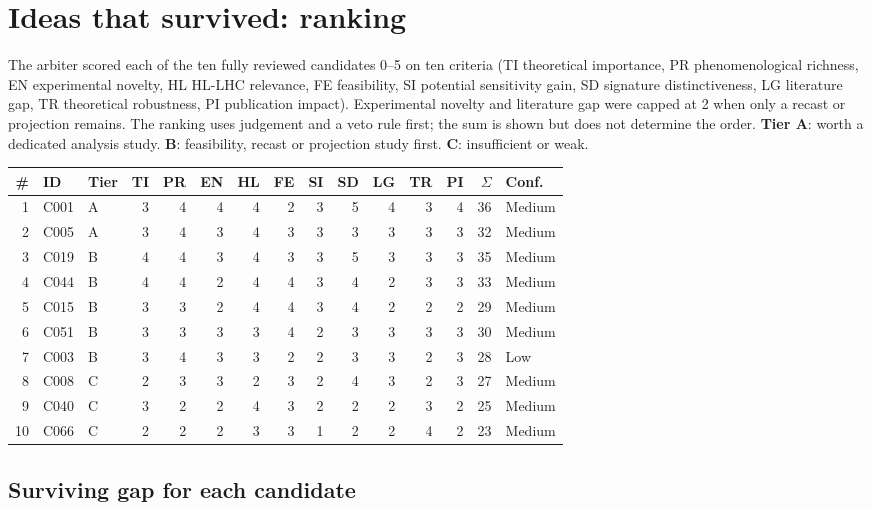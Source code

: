 \documentclass[11pt,a4paper]{article}
\begin{document}
\section{Ideas that survived: ranking}\label{sec:ranking}
The arbiter scored each of the ten fully reviewed candidates 0--5 on ten criteria (TI theoretical importance, PR phenomenological richness, EN experimental novelty, HL HL-LHC relevance, FE feasibility, SI potential sensitivity gain, SD signature distinctiveness, LG literature gap, TR theoretical robustness, PI publication impact). Experimental novelty and literature gap were capped at 2 when only a recast or projection remains. The ranking uses judgement and a veto rule first; the sum is shown but does not determine the order. \textbf{Tier A}: worth a dedicated analysis study. \textbf{B}: feasibility, recast or projection study first. \textbf{C}: insufficient or weak.
\begin{center}\scriptsize\setlength{\tabcolsep}{3.2pt}\begin{tabular}{rllrrrrrrrrrrrl}\toprule \# & ID & Tier & TI & PR & EN & HL & FE & SI & SD & LG & TR & PI & $\Sigma$ & Conf.\\\midrule
1 & C001 & A & 3 & 4 & 4 & 4 & 2 & 3 & 5 & 4 & 3 & 4 & 36 & Medium\\
2 & C005 & A & 3 & 4 & 3 & 4 & 3 & 3 & 3 & 3 & 3 & 3 & 32 & Medium\\
3 & C019 & B & 4 & 4 & 3 & 4 & 3 & 3 & 5 & 3 & 3 & 3 & 35 & Medium\\
4 & C044 & B & 4 & 4 & 2 & 4 & 4 & 3 & 4 & 2 & 3 & 3 & 33 & Medium\\
5 & C015 & B & 3 & 3 & 2 & 4 & 4 & 3 & 4 & 2 & 2 & 2 & 29 & Medium\\
6 & C051 & B & 3 & 3 & 3 & 3 & 4 & 2 & 3 & 3 & 3 & 3 & 30 & Medium\\
7 & C003 & B & 3 & 4 & 3 & 3 & 2 & 2 & 3 & 3 & 2 & 3 & 28 & Low\\
8 & C008 & C & 2 & 3 & 3 & 2 & 3 & 2 & 4 & 3 & 2 & 3 & 27 & Medium\\
9 & C040 & C & 3 & 2 & 2 & 4 & 3 & 2 & 2 & 2 & 3 & 2 & 25 & Medium\\
10 & C066 & C & 2 & 2 & 2 & 3 & 3 & 1 & 2 & 2 & 4 & 2 & 23 & Medium\\
\bottomrule\end{tabular}\end{center}
\subsection{Surviving gap for each candidate}
\end{document}
